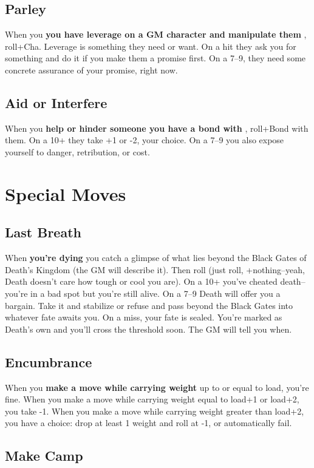 \subsection{Parley}


 When you \textbf{you have leverage on a GM character and manipulate them}
, roll+Cha. Leverage is something they need or want. On a hit they ask you for something and do it if you make them a promise first. On a 7--9, they need some concrete assurance of your promise, right now.
\subsection{Aid or Interfere}


 When you \textbf{help or hinder someone you have a bond with}
, roll+Bond with them. On a 10+ they take +1 or -2, your choice. On a 7--9 you also expose yourself to danger, retribution, or cost.
\section*{Special Moves}
\subsection{Last Breath}


 When \textbf{you're dying}
 you catch a glimpse of what lies beyond the Black Gates of Death's Kingdom (the GM will describe it). Then roll (just roll, +nothing--yeah, Death doesn't care how tough or cool you are). On a 10+ you've cheated death--you're in a bad spot but you're still alive. On a 7--9 Death will offer you a bargain. Take it and stabilize or refuse and pass beyond the Black Gates into whatever fate awaits you. On a miss, your fate is sealed. You're marked as Death's own and you'll cross the threshold soon. The GM will tell you when.
\subsection{Encumbrance}


 When you \textbf{make a move while carrying weight}
 up to or equal to load, you're fine. When you make a move while carrying weight equal to load+1 or load+2, you take -1. When you make a move while carrying weight greater than load+2, you have a choice: drop at least 1 weight and roll at -1, or automatically fail.
\subsection{Make Camp}


